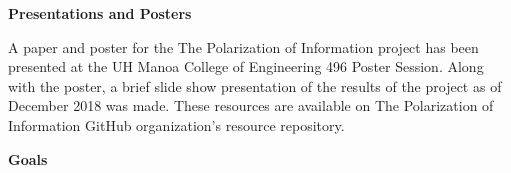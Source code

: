 \documentclass{article}
\begin{document}
\vspace{0.5cm}

\par \noindent \textbf{Presentations and Posters}

\par A paper and poster for the The Polarization of Information project has been presented at the UH Manoa College of Engineering 496 Poster Session. Along with the poster, a brief slide show presentation of the results of the project as of December 2018 was made. These resources are available on The Polarization of Information GitHub organization's resource repository. 

\par \noindent \textbf{Goals}

\par 
\end{document}
